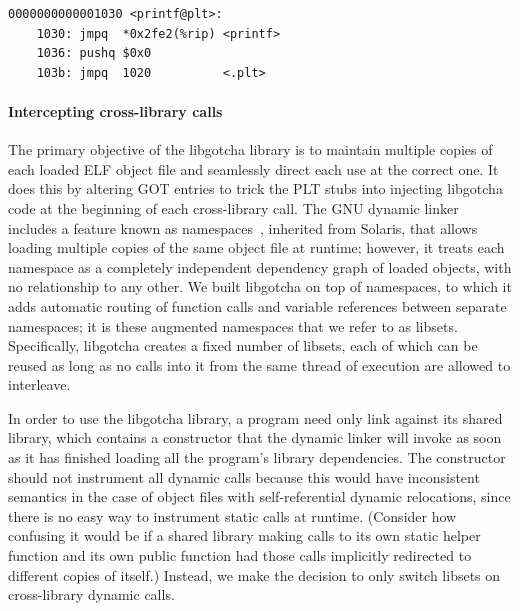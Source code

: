 \begin{lstlisting}[label=lst:plt,caption=Example PLT entry for call to \texttt{printf()}]
0000000000001030 <printf@plt>:
	1030: jmpq  *0x2fe2(%rip) <printf>
	1036: pushq $0x0
	103b: jmpq  1020          <.plt>
\end{lstlisting}

\paragraph{Intercepting cross-library calls}


The primary objective of the libgotcha library is to maintain multiple copies of each
loaded ELF object file and seamlessly direct each use at the correct one.  It does
this by altering GOT entries to trick the PLT stubs into injecting libgotcha code at
the beginning of each cross-library call.  The GNU
dynamic linker includes a feature known as namespaces~\cite{dlmopen-manpage},
inherited from Solaris, that allows loading multiple copies of the same object file
at runtime; however, it treats each namespace as a completely independent dependency
graph of loaded objects, with no relationship to any other.  We built
libgotcha on top of namespaces, to which it adds automatic routing of function calls
and variable references between separate namespaces; it is these augmented
namespaces that we refer to as libsets.  Specifically, libgotcha creates a fixed
number of
libsets, each of which can be reused as long as no calls into it from the same thread
of execution are allowed to interleave.

In order to use the libgotcha library, a program need only link against its shared
library, which contains a constructor that the dynamic linker will invoke as soon as
it has finished loading all the program's library dependencies.  The constructor
should not instrument all dynamic calls because this would
have inconsistent semantics in the case of object files with self-referential dynamic
relocations, since there is no easy way to instrument static calls at runtime.
(Consider how confusing it would be if a shared library making calls to its own
static helper function and its own public function had those calls implicitly
redirected to different
copies of itself.)  Instead, we make the decision to only switch libsets on
cross-library dynamic calls.

